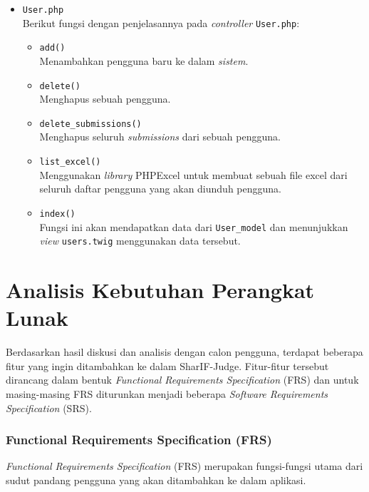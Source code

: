 \begin{itemize}
\begin{itemize}
\begin{itemize}
	      \end{itemize}

	\item \verb|User.php| \\
	      Berikut fungsi dengan penjelasannya pada \textit{controller} \verb|User.php|:

	      \begin{itemize}
		      \item \verb|add()| \\
		            Menambahkan pengguna baru ke dalam \textit{sistem}.
		      \item \verb|delete()| \\
		            Menghapus sebuah pengguna.
		      \item \verb|delete_submissions()| \\
		            Menghapus seluruh \textit{submissions} dari sebuah pengguna.
		      \item \verb|list_excel()| \\
		            Menggunakan \textit{library} PHPExcel untuk membuat sebuah file excel dari seluruh daftar pengguna yang akan diunduh pengguna.
		      \item \verb|index()| \\
		            Fungsi ini akan mendapatkan data dari \verb|User_model| dan menunjukkan \textit{view} \verb|users.twig| menggunakan data tersebut. 
	      \end{itemize}

\end{itemize}

\end{itemize}
\section{Analisis Kebutuhan Perangkat Lunak}
Berdasarkan hasil diskusi dan analisis dengan calon pengguna, terdapat beberapa fitur yang ingin ditambahkan ke dalam SharIF-Judge. Fitur-fitur tersebut dirancang dalam bentuk \textit{Functional Requirements Specification} (FRS) dan untuk masing-masing FRS diturunkan menjadi beberapa \textit{Software Requirements Specification} (SRS).

\subsubsection{Functional Requirements Specification (FRS)}
\textit{Functional Requirements Specification} (FRS) merupakan fungsi-fungsi utama dari sudut pandang pengguna yang akan ditambahkan ke dalam aplikasi.

